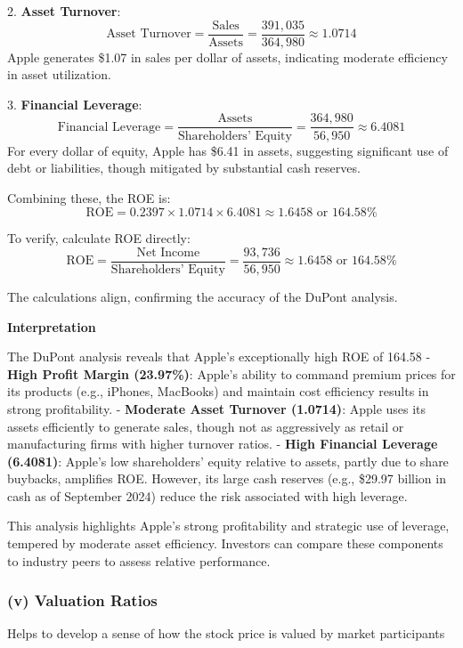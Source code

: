\documentclass[12pt]{article}
\begin{document}
2. \textbf{Asset Turnover}:
   \[
   \text{Asset Turnover} = \frac{\text{Sales}}{\text{Assets}} = \frac{391,035}{364,980} \approx 1.0714
   \]
   Apple generates \$1.07 in sales per dollar of assets, indicating moderate efficiency in asset utilization.

3. \textbf{Financial Leverage}:
   \[
   \text{Financial Leverage} = \frac{\text{Assets}}{\text{Shareholders' Equity}} = \frac{364,980}{56,950} \approx 6.4081
   \]
   For every dollar of equity, Apple has \$6.41 in assets, suggesting significant use of debt or liabilities, though mitigated by substantial cash reserves.

Combining these, the ROE is:
\[
\text{ROE} = 0.2397 \times 1.0714 \times 6.4081 \approx 1.6458 \text{ or } 164.58\%
\]

To verify, calculate ROE directly:
\[
\text{ROE} = \frac{\text{Net Income}}{\text{Shareholders' Equity}} = \frac{93,736}{56,950} \approx 1.6458 \text{ or } 164.58\%
\]

The calculations align, confirming the accuracy of the DuPont analysis.

\textbf{Interpretation}

The DuPont analysis reveals that Apple's exceptionally high ROE of 164.58%
- \textbf{High Profit Margin (23.97\%)}: Apple's ability to command premium prices for its products (e.g., iPhones, MacBooks) and maintain cost efficiency results in strong profitability.
- \textbf{Moderate Asset Turnover (1.0714)}: Apple uses its assets efficiently to generate sales, though not as aggressively as retail or manufacturing firms with higher turnover ratios.
- \textbf{High Financial Leverage (6.4081)}: Apple's low shareholders' equity relative to assets, partly due to share buybacks, amplifies ROE. However, its large cash reserves (e.g., \$29.97 billion in cash as of September 2024) reduce the risk associated with high leverage.

This analysis highlights Apple's strong profitability and strategic use of leverage, tempered by moderate asset efficiency. Investors can compare these components to industry peers to assess relative performance.


\subsubsection*{(v) Valuation Ratios}

Helps to develop a sense of how the stock price is valued by market participants
\end{document}
